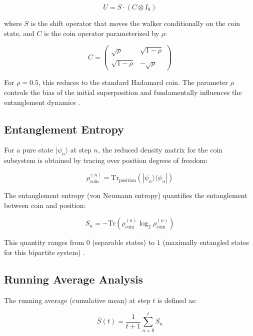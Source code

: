 \documentclass[11pt,a4paper]{article}
\begin{document}
\begin{equation}
U = S \cdot (C \otimes I_8)
\end{equation}

where $S$ is the shift operator that moves the walker conditionally on the coin state, and $C$ is the coin operator parameterized by $\rho$:

\begin{equation}
C = \begin{pmatrix} \sqrt{\rho} & \sqrt{1-\rho} \\ \sqrt{1-\rho} & -\sqrt{\rho} \end{pmatrix}
\end{equation}

For $\rho = 0.5$, this reduces to the standard Hadamard coin. The parameter $\rho$ controls the bias of the initial superposition and fundamentally influences the entanglement dynamics \citep{panahiyan2019}.

\subsection{Entanglement Entropy}

For a pure state $|\psi_n\rangle$ at step $n$, the reduced density matrix for the coin subsystem is obtained by tracing over position degrees of freedom:

\begin{equation}
\rho_{\mathrm{coin}}^{(n)} = \mathrm{Tr}_{\mathrm{position}}(|\psi_n\rangle \langle \psi_n|)
\end{equation}

The entanglement entropy (von Neumann entropy) quantifies the entanglement between coin and position:

\begin{equation}
S_n = -\mathrm{Tr}(\rho_{\mathrm{coin}}^{(n)} \log_2 \rho_{\mathrm{coin}}^{(n)})
\end{equation}

This quantity ranges from $0$ (separable states) to $1$ (maximally entangled states for this bipartite system) \citep{bauer2024}.

\subsection{Running Average Analysis}

The running average (cumulative mean) at step $t$ is defined as:

\begin{equation}
\bar{S}(t) = \frac{1}{t+1} \sum_{n=0}^{t} S_n
\end{equation}
\end{document}
